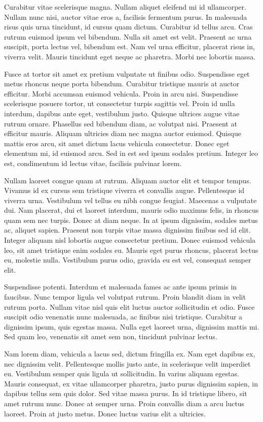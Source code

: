\documentclass{article}
\begin{document}
Curabitur vitae scelerisque magna. Nullam aliquet eleifend mi id
ullamcorper. Nullam nunc nisi, auctor vitae eros a, facilisis fermentum
purus. In malesuada risus quis urna tincidunt, id cursus quam dictum.
Curabitur id tellus arcu. Cras rutrum euismod ipsum vel bibendum. Nulla
sit amet est velit. Praesent ac urna suscipit, porta lectus vel,
bibendum est. Nam vel urna efficitur, placerat risus in, viverra velit.
Mauris tincidunt eget neque ac pharetra. Morbi nec lobortis massa.

Fusce at tortor sit amet ex pretium vulputate ut finibus odio.
Suspendisse eget metus rhoncus neque porta bibendum. Curabitur tristique
mauris at auctor efficitur. Morbi accumsan euismod vehicula. Proin in
arcu nisi. Suspendisse scelerisque posuere tortor, ut consectetur turpis
sagittis vel. Proin id nulla interdum, dapibus ante eget, vestibulum
justo. Quisque ultrices augue vitae rutrum ornare. Phasellus sed
bibendum diam, ac volutpat nisi. Praesent at efficitur mauris. Aliquam
ultricies diam nec magna auctor euismod. Quisque mattis eros arcu, sit
amet dictum lacus vehicula consectetur. Donec eget elementum mi, id
euismod arcu. Sed in est sed ipsum sodales pretium. Integer leo est,
condimentum id lectus vitae, facilisis pulvinar lorem.

Nullam laoreet congue quam at rutrum. Aliquam auctor elit et tempor
tempus. Vivamus id ex cursus sem tristique viverra et convallis augue.
Pellentesque id viverra urna. Vestibulum vel tellus eu nibh congue
feugiat. Maecenas a vulputate dui. Nam placerat, dui et laoreet
interdum, mauris odio maximus felis, in rhoncus quam sem nec turpis.
Donec at diam neque. In at ipsum dignissim, sodales metus ac, aliquet
sapien. Praesent non turpis vitae massa dignissim finibus sed id elit.
Integer aliquam nisl lobortis augue consectetur pretium. Donec euismod
vehicula leo, sit amet tristique enim sodales eu. Mauris eget purus
rhoncus, placerat lectus eu, molestie nulla. Vestibulum purus odio,
gravida eu est vel, consequat semper elit.

Suspendisse potenti. Interdum et malesuada fames ac ante ipsum primis in
faucibus. Nunc tempor ligula vel volutpat rutrum. Proin blandit diam in
velit rutrum porta. Nullam vitae nisl quis elit luctus auctor
sollicitudin et odio. Fusce suscipit odio venenatis nunc malesuada, ac
finibus nisi tristique. Curabitur a dignissim ipsum, quis egestas massa.
Nulla eget laoreet urna, dignissim mattis mi. Sed quam leo, venenatis
sit amet sem non, tincidunt pulvinar lectus.

Nam lorem diam, vehicula a lacus sed, dictum fringilla ex. Nam eget
dapibus ex, nec dignissim velit. Pellentesque mollis justo ante, in
scelerisque velit imperdiet eu. Vestibulum semper quis ligula ut
sollicitudin. In varius aliquam egestas. Mauris consequat, ex vitae
ullamcorper pharetra, justo purus dignissim sapien, in dapibus tellus
sem quis dolor. Sed vitae massa purus. In id tristique libero, sit amet
rutrum nunc. Donec at semper urna. Proin convallis diam a arcu luctus
laoreet. Proin at justo metus. Donec luctus varius elit a ultricies.
\end{document}
